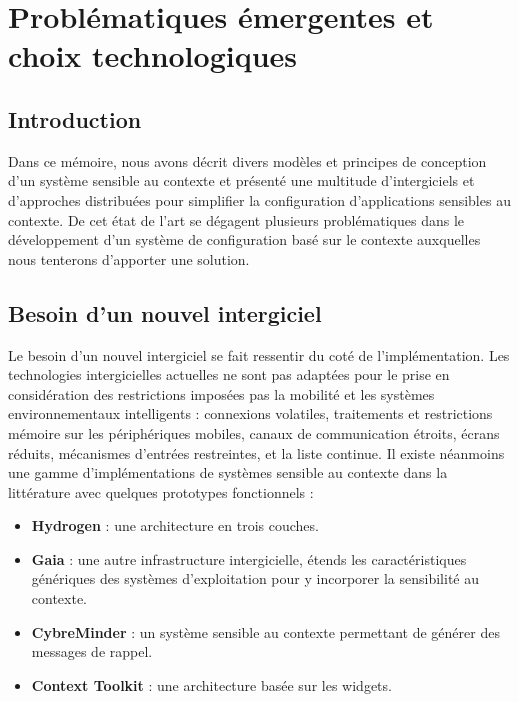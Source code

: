 \chapter{Problématiques émergentes et choix technologiques}

\section{Introduction}

Dans ce mémoire, nous avons décrit divers modèles et principes de conception
d'un système sensible au contexte et présenté une multitude d'intergiciels et
d'approches distribuées pour simplifier la configuration d'applications
sensibles au contexte. De cet état de l'art se dégagent plusieurs problématiques
dans le développement d'un système de configuration basé sur le contexte
auxquelles nous tenterons d'apporter une solution.

\section{Besoin d'un nouvel intergiciel}

Le besoin d'un nouvel intergiciel se fait ressentir du coté de l'implémentation.
Les technologies intergicielles actuelles ne sont pas adaptées pour le prise en
considération des restrictions imposées pas la mobilité et les systèmes
environnementaux intelligents : connexions volatiles, traitements et restrictions
mémoire sur les périphériques mobiles, canaux de communication étroits, écrans
réduits, mécanismes d'entrées restreintes, et la liste continue. Il existe
néanmoins une gamme d'implémentations de systèmes sensible au contexte dans la
littérature avec quelques prototypes fonctionnels :

\begin{itemize}
    \item \textbf{Hydrogen} \cite{hofer_context-awareness_2003}: 
        une architecture en trois couches.
    \item \textbf{Gaia} \cite{chetan_mobile_2005}: 
        une autre infrastructure intergicielle, étends les caractéristiques
        génériques des systèmes d'exploitation pour y incorporer la
        sensibilité au contexte.
    \item \textbf{CybreMinder} \cite{abowd_context-aware_2002}: 
        un système sensible au contexte permettant de générer des messages
        de rappel.
    \item \textbf{Context Toolkit} \cite{dey_conceptual_2001}: 
	    une architecture basée sur les widgets.
\end{itemize}

